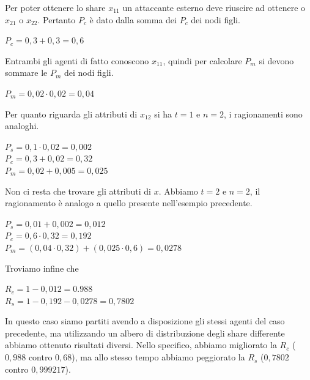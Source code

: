 Per poter ottenere lo share $ x_{11} $ un attaccante esterno deve riuscire ad ottenere
o $ x_{21} $ o $ x_{22} $. Pertanto $ P_c $ è dato dalla somma dei $ P_c $ dei nodi figli.
\begin{tightcenter}
	$ P_c = 0,3 + 0,3 = 0,6 $
\end{tightcenter}

Entrambi gli agenti di fatto conoscono $ x_{11} $, quindi per calcolare $ P_m $ si devono
sommare le $ P_m $ dei nodi figli.
\begin{tightcenter}
	$ P_m = 0,02 \cdot 0,02 = 0,04$
\end{tightcenter}

Per quanto riguarda gli attributi di $ x_{12} $ si ha $ t = 1 $ e $ n = 2 $,
i ragionamenti sono analoghi.
\begin{tightcenter}
	$ P_s = 0,1 \cdot 0,02 = 0,002 $\\
	$ P_c = 0,3 + 0,02 = 0,32 $\\
	$ P_m = 0,02 + 0,005 = 0,025 $
\end{tightcenter}

Non ci resta che trovare gli attributi di $ x $.
Abbiamo $ t = 2 $ e $ n = 2 $, il ragionamento è analogo a quello presente nell'esempio precedente.
\begin{tightcenter}
	$ P_s = 0,01 + 0,002 = 0,012 $\\
	$ P_c = 0,6 \cdot 0,32 = 0,192 $\\
	$ P_m = (0,04 \cdot 0,32) + (0,025 \cdot 0,6) = 0,0278 $\\
\end{tightcenter}

Troviamo infine che
\begin{tightcenter}
	$ R_c = 1 - 0,012 = 0.988 $\\
	$ R_s = 1 - 0,192 - 0,0278 = 0,7802 $
\end{tightcenter}

In questo caso siamo partiti avendo a disposizione gli stessi
agenti del caso precedente, ma utilizzando
un albero di distribuzione degli share differente abbiamo ottenuto risultati diversi.
Nello specifico, abbiamo migliorato la $ R_c $ ($ 0,988 $ contro $ 0,68 $), ma
allo stesso tempo abbiamo peggiorato la $ R_s $ ($ 0,7802 $ contro $ 0,999217 $).


